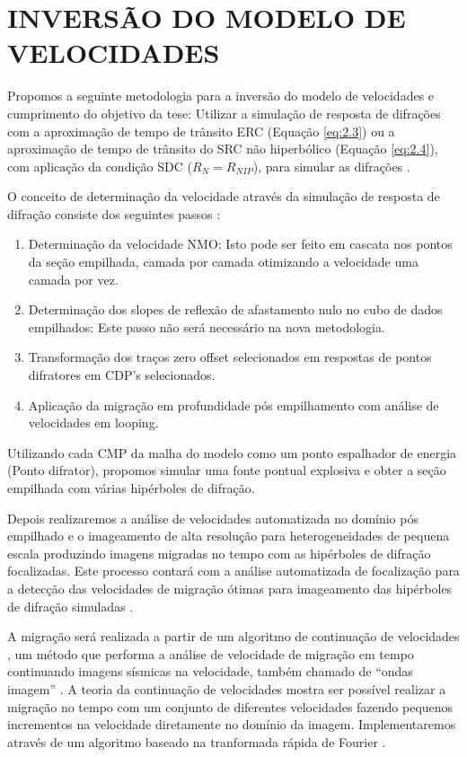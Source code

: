 \chapter{INVERSÃO DO MODELO DE VELOCIDADES}
\label{cap8:velocidades}

Propomos a seguinte metodologia para a inversão do modelo de velocidades e cumprimento do objetivo da tese:
Utilizar a simulação de resposta de difrações com a aproximação de tempo de trânsito ERC (Equação \ref{eq:2.3}) ou
a aproximação de tempo de trânsito do SRC não hiperbólico (Equação \ref{eq:2.4}), 
com aplicação da condição SDC ($R_N=R_{NIP}$),
para simular as difrações \cite{diffractions}.

O conceito de determinação da velocidade através da simulação de resposta de difração
consiste dos seguintes passos \cite{diffractions}:

\begin{enumerate}
 \item Determinação da velocidade NMO: Isto pode ser feito em cascata nos pontos da
seção empilhada, camada por camada otimizando a velocidade uma camada por vez.
\item Determinação dos slopes de reflexão de afastamento nulo no cubo de dados empilhados: 
Este passo não será necessário na nova metodologia.
\item Transformação dos traços zero offset selecionados em respostas de pontos difratores em CDP's
selecionados.
\item Aplicação da migração em profundidade pós empilhamento com análise de velocidades
em looping.
\end{enumerate}

Utilizando cada CMP da malha do modelo como um ponto espalhador de energia (Ponto difrator), propomos 
simular uma fonte pontual explosiva e obter a seção empilhada com várias hipérboles de difração. 

Depois realizaremos a análise de velocidades automatizada no domínio pós empilhado e o imageamento de alta resolução
para heterogeneidades de pequena escala produzindo imagens migradas no tempo com as hipérboles de difração
focalizadas. Este processo contará com a análise automatizada de focalização para a detecção das
velocidades de migração ótimas para imageamento das hipérboles de difração simuladas \cite{sep_dif}.

A migração será realizada a partir de um algoritmo de continuação de velocidades \cite{fomel2003a}, um método que performa
a análise de velocidade de migração em tempo continuando imagens sísmicas na velocidade, também chamado de
``ondas imagem'' \cite{hubral1996}. A teoria da continuação de velocidades mostra ser possível realizar a migração no tempo
com um conjunto de diferentes velocidades fazendo pequenos incrementos na velocidade diretamente no domínio da imagem.
Implementaremos através de um algoritmo baseado na tranformada rápida de Fourier \cite{bfomel2003}.

